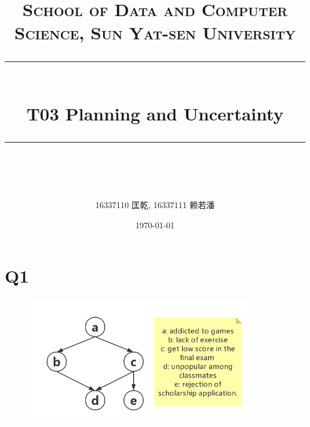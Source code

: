 \documentclass[a4paper, 11pt]{article}
\title{
\normalfont \normalsize
\textsc{School of Data and Computer Science, Sun Yat-sen University} \\ [25pt] %
\rule{\textwidth}{0.5pt} \\[0.4cm] %
\huge  T03 Planning and Uncertainty\\ %
\rule{\textwidth}{2pt} \\[0.5cm] %
\author{16337110 匡乾, 16337111 赖若潘}
\date{\normalsize\today}
}
\begin{document}
\maketitle
\tableofcontents
\newpage
\section{Q1}
\begin{figure}
  \centering
  \includegraphics[width=10cm]{pic/1}
  \caption{}
  \label{}
\end{figure}
\end{document}
